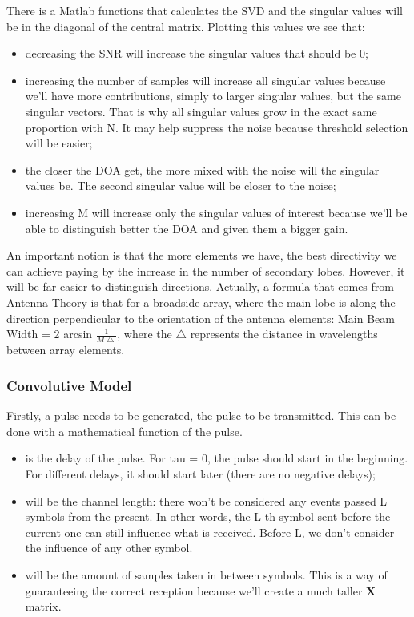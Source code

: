 \documentclass[12pt, a4paper]{article}
\begin{document}
\par There is a Matlab functions that calculates the SVD and the singular values will be in the diagonal of the central matrix. Plotting this values we see that:
\begin{itemize}
    \item decreasing the SNR will increase the singular values that should be 0;
    \item increasing the number of samples will increase all singular values because we'll have more contributions, simply to larger singular values, but the same singular vectors. That is why all singular values grow in the exact same proportion with N. It may help suppress the noise because threshold selection will be easier;
    \item the closer the DOA get, the more mixed with the noise will the singular values be. The second singular value will be closer to the noise;
    \item increasing M will increase only the singular values of interest because we'll be able to distinguish better the DOA and given them a bigger gain.
\end{itemize}

\par An important notion is that the more elements we have, the best directivity we can achieve paying by the increase in the number of secondary lobes. However, it will be far easier to distinguish directions. Actually, a formula that comes from Antenna Theory is that for a broadside array, where the main lobe is along the direction perpendicular to the orientation of the antenna elements: Main Beam Width = 2  arcsin $\frac{1}{M \bigtriangleup}$, where the $\bigtriangleup$ represents the distance in wavelengths between array elements.





\subsubsection{Convolutive Model}

\par Firstly, a pulse needs to be generated, the pulse to be transmitted. This can be done with a mathematical function of the pulse. 

\begin{itemize}
    \item {} is the delay of the pulse. For tau = 0, the pulse should start in the beginning. For different delays, it should start later (there are no negative delays); 
    \item {} will be the channel length: there won't be considered any events passed L symbols from the present. In other words, the L-th symbol sent before the current one can still influence what is received. Before L, we don't consider the influence of any other symbol.
    \item {} will be the amount of samples taken in between symbols. This is a way of guaranteeing the correct reception because we'll create a much taller $\mathbf{X}$ matrix.
\end{itemize}
\end{document}
